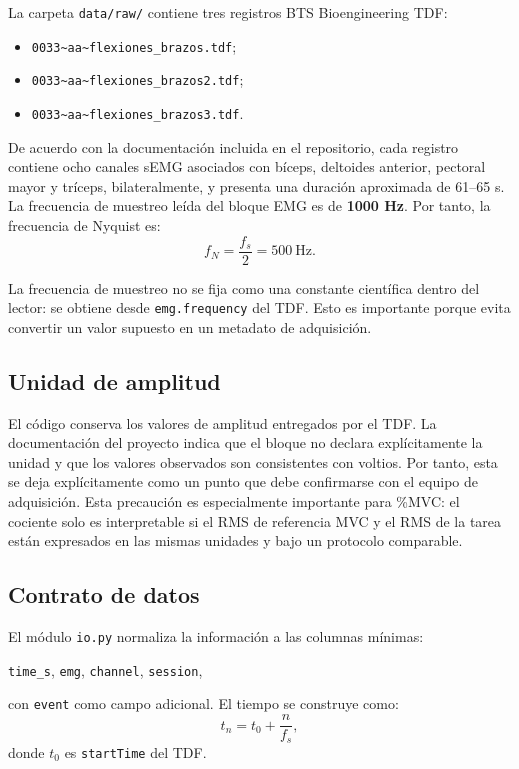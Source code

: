\documentclass[11pt,spanish]{article}
\begin{document}
La carpeta \texttt{data/raw/} contiene tres registros BTS Bioengineering TDF:
\begin{itemize}
    \item \texttt{0033\textasciitilde aa\textasciitilde flexiones\_brazos.tdf};
    \item \texttt{0033\textasciitilde aa\textasciitilde flexiones\_brazos2.tdf};
    \item \texttt{0033\textasciitilde aa\textasciitilde flexiones\_brazos3.tdf}.
\end{itemize}

De acuerdo con la documentación incluida en el repositorio, cada registro contiene ocho canales sEMG asociados con bíceps, deltoides anterior, pectoral mayor y tríceps, bilateralmente, y presenta una duración aproximada de 61--65 s. La frecuencia de muestreo leída del bloque EMG es de \textbf{1000 Hz}. Por tanto, la frecuencia de Nyquist es:
\begin{equation}
f_N=\frac{f_s}{2}=500\ \mathrm{Hz}.
\end{equation}

La frecuencia de muestreo no se fija como una constante científica dentro del lector: se obtiene desde \texttt{emg.frequency} del TDF. Esto es importante porque evita convertir un valor supuesto en un metadato de adquisición.

\subsection{Unidad de amplitud}

El código conserva los valores de amplitud entregados por el TDF. La documentación del proyecto indica que el bloque no declara explícitamente la unidad y que los valores observados son consistentes con voltios. Por tanto, esta se deja explícitamente como un punto que debe confirmarse con el equipo de adquisición.
Esta precaución es especialmente importante para \%MVC: el cociente solo es interpretable si el RMS de referencia MVC y el RMS de la tarea están expresados en las mismas unidades y bajo un protocolo comparable.

\subsection{Contrato de datos}

El módulo \texttt{io.py} normaliza la información a las columnas mínimas:
\begin{center}
\texttt{time\_s}, \quad \texttt{emg}, \quad \texttt{channel}, \quad \texttt{session},
\end{center}
con \texttt{event} como campo adicional. El tiempo se construye como:
\begin{equation}
t_n=t_0+\frac{n}{f_s},
\end{equation}
donde $t_0$ es \texttt{startTime} del TDF.
\end{document}
